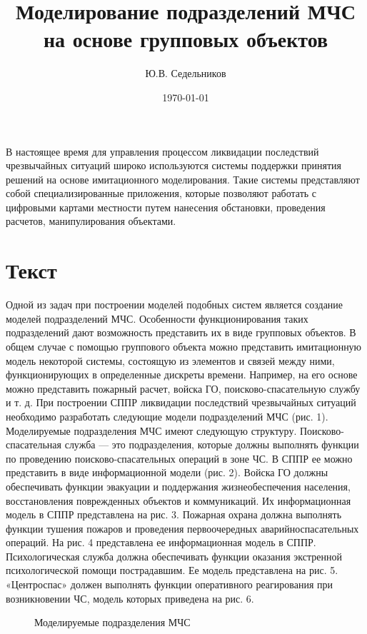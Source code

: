 \documentclass[12pt]{article}
\begin{document}
\title{Моделирование подразделений МЧС на основе
групповых объектов}

\author{Ю.В. Седельников}
\date{\today}
\maketitle

\abstract
В настоящее время для управления процессом ликвидации последствий чрезвычайных
ситуаций широко используются системы поддержки принятия решений на основе
имитационного моделирования. Такие системы представляют собой специализированные
приложения, которые позволяют работать с цифровыми картами местности путем нанесения
обстановки, проведения расчетов, манипулирования объектами.

\section{Текст}

Одной из задач при построении моделей подобных
систем является создание моделей подразделений
МЧС. Особенности функционирования таких подразделений дают возможность представить их в виде групповых объектов.
В общем случае с помощью группового объекта
можно представить имитационную модель некоторой
системы, состоящую из элементов и связей между ними, функционирующих в определенные дискреты времени. Например, на его основе можно представить пожарный расчет, войска ГО, поисково-спасательную
службу и т. д.
При построении СППР ликвидации последствий
чрезвычайных ситуаций необходимо разработать следующие модели подразделений МЧС (рис. 1).
Моделируемые подразделения МЧС имеют следующую структуру.
Поисково-спасательная служба — это подразделения, которые должны выполнять функции по проведению поисково-спасательных операций в зоне ЧС.
В СППР ее можно представить в виде информационной модели (рис. 2).
Войска ГО должны обеспечивать функции эвакуации и поддержания жизнеобеспечения населения, восстановления поврежденных объектов и коммуникаций.
Их информационная модель в СППР представлена
на рис. 3.
Пожарная охрана должна выполнять функции тушения пожаров и проведения первоочередных аварийноспасательных операций. На рис. 4 представлена ее информационная модель в СППР.
Психологическая служба должна обеспечивать
функции оказания экстренной психологической помощи пострадавшим. Ее модель представлена
на рис. 5.
«Центроспас» должен выполнять функции оперативного реагирования при возникновении ЧС, модель которых приведена на рис. 6.

\begin{figure}[h]
\caption{Моделируемые подразделения МЧС}
\end{figure}
\end{document}
